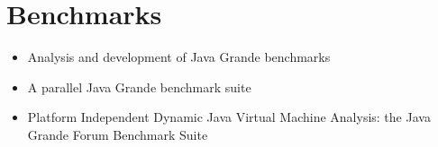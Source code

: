\section*{Benchmarks}
\label{sec:lr-benchmarks}

\begin{itemize}
\item[\checkmark] Analysis and development of Java Grande benchmarks
  \cite{Mathew1999}
\item[\checkmark] A parallel Java Grande benchmark suite
  \cite{Smith2001}
\item[\checkmark] Platform Independent Dynamic Java Virtual Machine
  Analysis: the Java Grande Forum Benchmark Suite \cite{Gregg2003}
\end{itemize}


